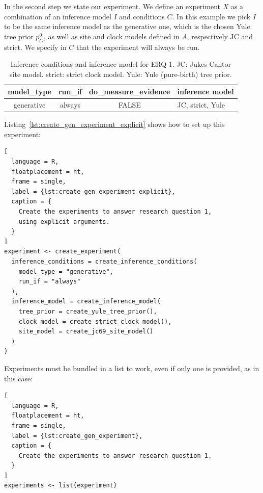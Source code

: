 In the second step we state our experiment.
We define an experiment $\mathit{X}$ as a combination of an inference model 
$\mathit{I}$
and conditions $\mathit{C}$.
In this example we pick $\mathit{I}$ to be the same inference model as the 
generative one,
which is the chosen Yule tree prior $\mathit{p_{G}^0}$, as well as site and clock 
models defined in $\mathit{A}$, respectively JC and strict.
We specify in $\mathit{C}$ that the experiment will always be run.

\begin{table}
  \begin{tabular}{ | c | c | c | l | }
    \hline
    \textbf{model\_type} &
    \textbf{run\_if} &
    \textbf{do\_measure\_evidence} & 
    \textbf{inference model} \\ 
    \hline
    generative &
    always &
    FALSE &
    JC, strict, Yule \\
    \hline
  \end{tabular}
  \caption{
    Inference conditions and inference model for ERQ 1.
    JC: Jukes-Cantor site model.
    strict: strict clock model.
    Yule: Yule (pure-birth) tree prior.
  }
  \label{tab:RQ1}
\end{table}

Listing~\ref{lst:create_gen_experiment_explicit} shows how to
set up this experiment:

\begin{lstlisting}[
  language = R,
  floatplacement = ht,
  frame = single,
  label = {lst:create_gen_experiment_explicit},
  caption = {
    Create the experiments to answer research question 1, 
    using explicit arguments.
  }
]
experiment <- create_experiment(
  inference_conditions = create_inference_conditions(
    model_type = "generative", 
    run_if = "always"
  ), 
  inference_model = create_inference_model(
    tree_prior = create_yule_tree_prior(),
    clock_model = create_strict_clock_model(), 
    site_model = create_jc69_site_model()
  )
)
\end{lstlisting}

Experiments must be bundled in a list to work, even if only one is provided, as 
in this case:

\begin{lstlisting}[
  language = R, 
  floatplacement = ht,
  frame = single,
  label = {lst:create_gen_experiment},
  caption = {
    Create the experiments to answer research question 1.
  }
]
experiments <- list(experiment)
\end{lstlisting}

